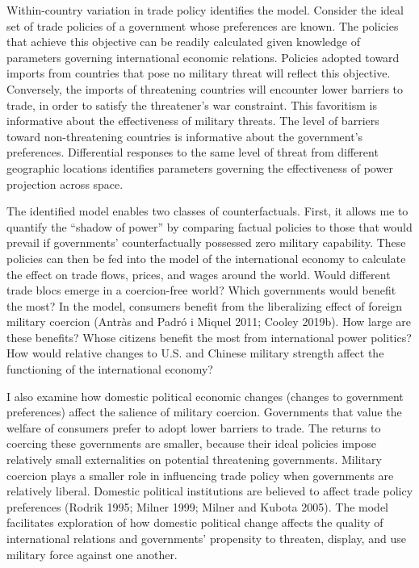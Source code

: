 \documentclass{puthesis}
\begin{document}
Within-country variation in trade policy identifies the model. Consider
the ideal set of trade policies of a government whose preferences are
known. The policies that achieve this objective can be readily
calculated given knowledge of parameters governing international
economic relations. Policies adopted toward imports from countries that
pose no military threat will reflect this objective. Conversely, the
imports of threatening countries will encounter lower barriers to trade,
in order to satisfy the threatener's war constraint. This favoritism is
informative about the effectiveness of military threats. The level of
barriers toward non-threatening countries is informative about the
government's preferences. Differential responses to the same level of
threat from different geographic locations identifies parameters
governing the effectiveness of power projection across space.

The identified model enables two classes of counterfactuals. First, it
allows me to quantify the ``shadow of power'' by comparing factual
policies to those that would prevail if governments' counterfactually
possessed zero military capability. These policies can then be fed into
the model of the international economy to calculate the effect on trade
flows, prices, and wages around the world. Would different trade blocs
emerge in a coercion-free world? Which governments would benefit the
most? In the model, consumers benefit from the liberalizing effect of
foreign military coercion (Antràs and Padró i Miquel 2011; Cooley
2019b). How large are these benefits? Whose citizens benefit the most
from international power politics? How would relative changes to U.S.
and Chinese military strength affect the functioning of the
international economy?

I also examine how domestic political economic changes (changes to
government preferences) affect the salience of military coercion.
Governments that value the welfare of consumers prefer to adopt lower
barriers to trade. The returns to coercing these governments are
smaller, because their ideal policies impose relatively small
externalities on potential threatening governments. Military coercion
plays a smaller role in influencing trade policy when governments are
relatively liberal. Domestic political institutions are believed to
affect trade policy preferences (Rodrik 1995; Milner 1999; Milner and
Kubota 2005). The model facilitates exploration of how domestic
political change affects the quality of international relations and
governments' propensity to threaten, display, and use military force
against one another.
\end{document}
